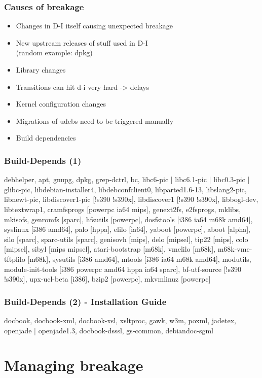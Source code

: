 \documentclass{beamer}
\begin{document}
\begin{frame}
  \frametitle{Causes of breakage}
	\begin{itemize}[<+->]
	\item
		Changes in D-I itself causing unexpected breakage
	\item
		New upstream releases of stuff used in D-I \\
		\small (random example: dpkg)
	\item
		Library changes
	\item
		Transitions can hit d-i very hard -> delays
	\item
		Kernel configuration changes
	\item
		Migrations of udebs need to be triggered manually
	\item
		Build dependencies
	\end{itemize}
\end{frame}

\begin{frame}
  \frametitle{Build-Depends (1)}
\small debhelper, apt, gnupg, dpkg, grep-dctrl, bc, libc6-pic | libc6.1-pic | libc0.3-pic | glibc-pic, libdebian-installer4, libdebconfclient0, libparted1.6-13, libslang2-pic, libnewt-pic, libdiscover1-pic [!s390 !s390x], libdiscover1 [!s390 !s390x], libbogl-dev, libtextwrap1, cramfsprogs [powerpc ia64 mips], genext2fs, e2fsprogs, mklibs, mkisofs, genromfs [sparc], hfsutils [powerpc], dosfstools [i386 ia64 m68k amd64], syslinux [i386 amd64], palo [hppa], elilo [ia64], yaboot [powerpc], aboot [alpha], silo [sparc], sparc-utils [sparc], genisovh [mips], delo [mipsel], tip22 [mips], colo [mipsel], sibyl [mips mipsel], atari-bootstrap [m68k], vmelilo [m68k], m68k-vme-tftplilo [m68k], sysutils [i386 amd64], mtools [i386 ia64 m68k amd64], modutils, module-init-tools [i386 powerpc amd64 hppa ia64 sparc], bf-utf-source [!s390 !s390x], upx-ucl-beta [i386], bzip2 [powerpc], mkvmlinuz [powerpc]
\end{frame}

\begin{frame}
  \frametitle{Build-Depends (2) - Installation Guide}
docbook, docbook-xml, docbook-xsl, xsltproc, gawk, w3m, poxml, jadetex, openjade | openjade1.3, docbook-dsssl, gs-common, debiandoc-sgml
\end{frame}


\section{Managing breakage}
\end{document}
